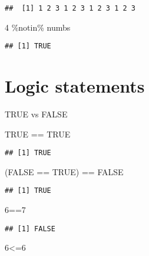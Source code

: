 \documentclass[
]{book}
\newenvironment{Shaded}{\begin{snugshade}}{\end{snugshade}}
\newcommand{\ConstantTok}[1]{\textcolor[rgb]{0.00,0.00,0.00}{#1}}
\newcommand{\DecValTok}[1]{\textcolor[rgb]{0.00,0.00,0.81}{#1}}
\newcommand{\NormalTok}[1]{#1}
\newcommand{\SpecialCharTok}[1]{\textcolor[rgb]{0.00,0.00,0.00}{#1}}
\begin{document}
\begin{verbatim}
##  [1] 1 2 3 1 2 3 1 2 3 1 2 3
\end{verbatim}

\begin{Shaded}
\begin{Highlighting}[]
\DecValTok{4} \SpecialCharTok{\%notin\%}\NormalTok{ numbs}
\end{Highlighting}
\end{Shaded}

\begin{verbatim}
## [1] TRUE
\end{verbatim}

\hypertarget{logic-statements}{%
\chapter{Logic statements}\label{logic-statements}}

TRUE vs FALSE

\begin{Shaded}
\begin{Highlighting}[]
\ConstantTok{TRUE} \SpecialCharTok{==} \ConstantTok{TRUE}
\end{Highlighting}
\end{Shaded}

\begin{verbatim}
## [1] TRUE
\end{verbatim}

\begin{Shaded}
\begin{Highlighting}[]
\NormalTok{(}\ConstantTok{FALSE} \SpecialCharTok{==} \ConstantTok{TRUE}\NormalTok{) }\SpecialCharTok{==} \ConstantTok{FALSE}
\end{Highlighting}
\end{Shaded}

\begin{verbatim}
## [1] TRUE
\end{verbatim}

\begin{Shaded}
\begin{Highlighting}[]
\DecValTok{6}\SpecialCharTok{==}\DecValTok{7}
\end{Highlighting}
\end{Shaded}

\begin{verbatim}
## [1] FALSE
\end{verbatim}

\begin{Shaded}
\begin{Highlighting}[]
\DecValTok{6}\SpecialCharTok{\textless{}=}\DecValTok{6}
\end{Highlighting}
\end{Shaded}
\end{document}
